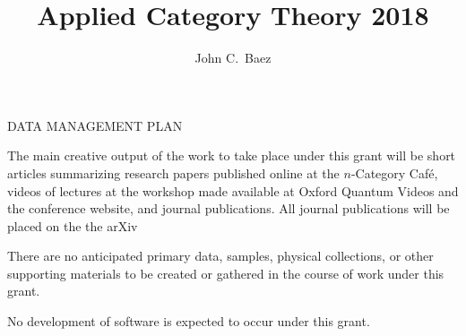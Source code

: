 \documentclass[12pt,letterpaper]{amsart}
\newcommand{\ctr}[1]{\begin{center} #1 \end{center}}
\begin{document}
\ctr{\large DATA MANAGEMENT PLAN}
\title{Applied Category Theory 2018}
\author{John C.\ Baez}

\maketitle

The main creative output of the work to take place under this grant will be short articles summarizing research papers published online at the $n$-Category Caf\'e, videos of lectures at the workshop made available at Oxford Quantum Videos and the conference website, and journal publications.  All journal publications will be placed on the the arXiv

There are no anticipated primary data, samples, physical collections, or other supporting materials to be created or gathered in the course of work under this grant.

No development of software is expected to occur under this grant.  
\end{document}
